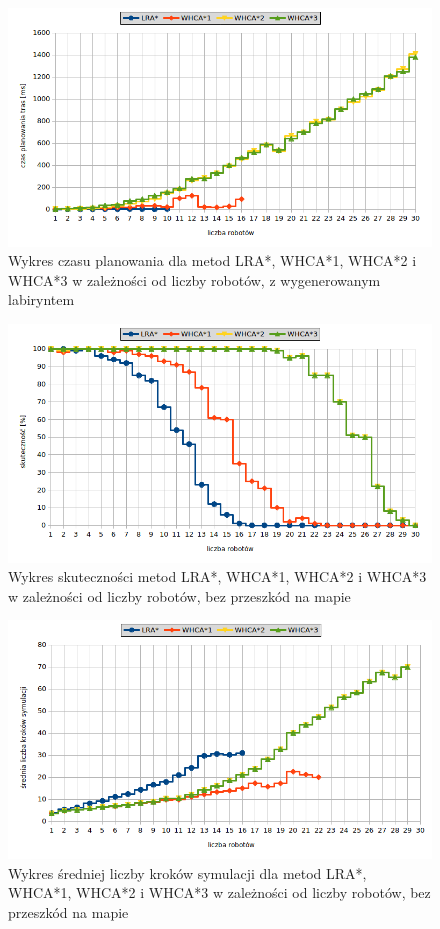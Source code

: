 \begin{figure}[H]
	\centering
	\includegraphics[width=0.9\columnwidth]{img/plots/test-steps-maze-robots-calctime}
	\caption{Wykres czasu planowania dla metod LRA*, WHCA*1, WHCA*2 i WHCA*3 w zależności od liczby robotów, z wygenerowanym labiryntem}
	\label{fig:test-steps-maze-robots-calctime}
\end{figure}
\begin{figure}[H]
	\centering
	\includegraphics[width=0.9\columnwidth]{img/plots/test-steps-empty-robots-eff}
	\caption{Wykres skuteczności metod LRA*, WHCA*1, WHCA*2 i WHCA*3 w zależności od liczby robotów, bez przeszkód na mapie}
	\label{fig:test-steps-empty-robots-eff}
\end{figure}
\begin{figure}[H]
	\centering
	\includegraphics[width=0.9\columnwidth]{img/plots/test-steps-empty-robots-steps}
	\caption{Wykres średniej liczby kroków symulacji dla metod LRA*, WHCA*1, WHCA*2 i WHCA*3 w zależności od liczby robotów, bez przeszkód na mapie}
	\label{fig:test-steps-empty-robots-steps}
\end{figure}
